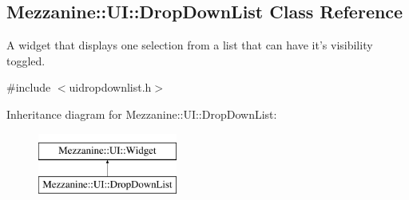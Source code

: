 \hypertarget{classMezzanine_1_1UI_1_1DropDownList}{
\subsection{Mezzanine::UI::DropDownList Class Reference}
\label{classMezzanine_1_1UI_1_1DropDownList}
}


A widget that displays one selection from a list that can have it's visibility toggled.  




{\ttfamily \#include $<$uidropdownlist.h$>$}

Inheritance diagram for Mezzanine::UI::DropDownList:\begin{figure}[H]
\begin{center}
\leavevmode
\includegraphics[height=2.000000cm]{classMezzanine_1_1UI_1_1DropDownList}
\end{center}
\end{figure}
